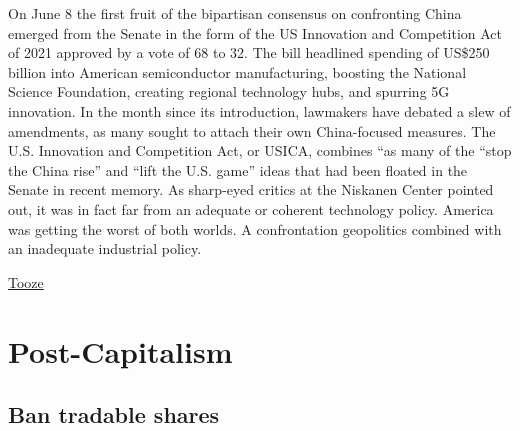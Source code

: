 \documentclass[
]{book}
\begin{document}
On June 8 the first fruit of the bipartisan consensus on confronting China emerged from the Senate in the form of the US Innovation and Competition Act of 2021 approved by a vote of 68 to 32. The bill headlined spending of US\$250 billion into American semiconductor manufacturing, boosting the National Science Foundation, creating regional technology hubs, and spurring 5G innovation. In the month since its introduction, lawmakers have debated a slew of amendments, as many sought to attach their own China-focused measures. The U.S. Innovation and Competition Act, or USICA, combines ``as many of the ``stop the China rise'' and ``lift the U.S. game'' ideas that had been floated in the Senate in recent memory. As sharp-eyed critics at the Niskanen Center pointed out, it was in fact far from an adequate or coherent technology policy. America was getting the worst of both worlds. A confrontation geopolitics combined with an inadequate industrial policy.

\href{https://adamtooze.substack.com/p/chartbook-newsletter-23}{Tooze}

\hypertarget{post-capitalism}{%
\chapter{Post-Capitalism}\label{post-capitalism}}

\hypertarget{ban-tradable-shares}{%
\section{Ban tradable shares}\label{ban-tradable-shares}}
\end{document}
